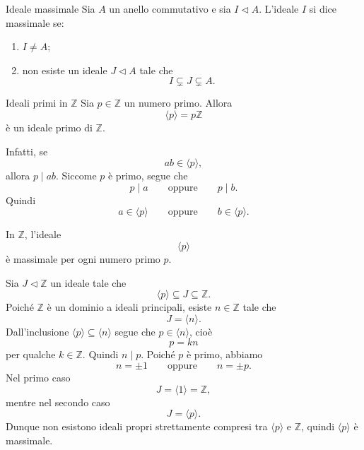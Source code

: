 \documentclass[a4paper]{article}
\begin{document}
\begin{radioactive}
\begin{snippetdefinition}{Ideale massimale}
    Sia \(A\) un anello commutativo e sia \(I\triangleleft A\).
    L'ideale \(I\) si dice massimale se:
    \begin{enumerate}
        \item \(I\neq A\);
        \item non esiste un ideale \(J\triangleleft A\) tale che
        \[
            I\subsetneq J\subsetneq A.
        \]
    \end{enumerate}
\end{snippetdefinition}
\end{radioactive}

\begin{radioactive}
\begin{snippetexample}{Ideali primi in \(\mathbb{Z}\)}
    Sia \(p\in\mathbb{Z}\) un numero primo.
    Allora
    \[
        \langle p \rangle=p\mathbb{Z}
    \]
    è un ideale primo di \(\mathbb{Z}\).

    Infatti, se
    \[
        ab\in \langle p \rangle,
    \]
    allora \(p\mid ab\). Siccome \(p\) è primo, segue che
    \[
        p\mid a
        \qquad
        \text{oppure}
        \qquad
        p\mid b.
    \]
    Quindi
    \[
        a\in \langle p \rangle
        \qquad
        \text{oppure}
        \qquad
        b\in \langle p \rangle.
    \]
\end{snippetexample}
\end{radioactive}

\begin{radioactive}
\begin{snippetexample}{}
    In \(\mathbb{Z}\), l'ideale
    \[
        \langle p \rangle
    \]
    è massimale per ogni numero primo \(p\).
\end{snippetexample}
\end{radioactive}

\begin{radioactive}
\begin{snippetproof}{}
    Sia \(J\triangleleft \mathbb{Z}\) un ideale tale che
    \[
        \langle p \rangle\subseteq J\subseteq \mathbb{Z}.
    \]
    Poiché \(\mathbb{Z}\) è un dominio a ideali principali, esiste \(n\in\mathbb{Z}\) tale che
    \[
        J=\langle n \rangle.
    \]
    Dall'inclusione \(\langle p \rangle\subseteq \langle n \rangle\) segue che \(p\in\langle n \rangle\), cioè
    \[
        p=kn
    \]
    per qualche \(k\in\mathbb{Z}\). Quindi \(n\mid p\).
    Poiché \(p\) è primo, abbiamo
    \[
        n=\pm 1
        \qquad
        \text{oppure}
        \qquad
        n=\pm p.
    \]
    Nel primo caso
    \[
        J=\langle 1 \rangle=\mathbb{Z},
    \]
    mentre nel secondo caso
    \[
        J=\langle p \rangle.
    \]
    Dunque non esistono ideali propri strettamente compresi tra \(\langle p \rangle\) e \(\mathbb{Z}\), quindi \(\langle p \rangle\) è massimale.
\end{snippetproof}
\end{radioactive}
\end{document}
